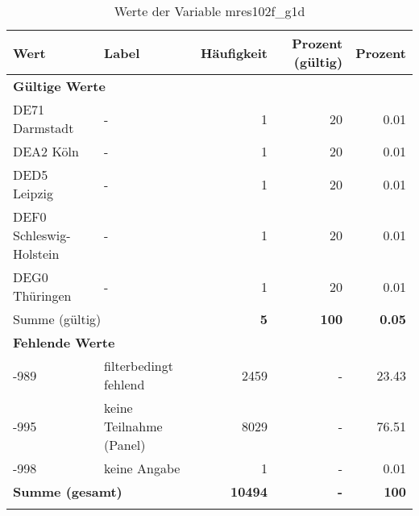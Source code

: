      \begin{longtable}{Xlrrr}
     \toprule
     \textbf{Wert} & \textbf{Label} & \textbf{Häufigkeit} & \textbf{Prozent (gültig)} & \textbf{Prozent} \\
     \endhead
     \midrule
     \multicolumn{5}{l}{\textbf{Gültige Werte}}\\

     \multicolumn{1}{X}{DE71 Darmstadt} &
     - &
     \num{1} &
     \num[round-mode=places,round-precision=2]{20} &
     \num[round-mode=places,round-precision=2]{0.01} \\

     \multicolumn{1}{X}{DEA2 Köln} &
     - &
     \num{1} &
     \num[round-mode=places,round-precision=2]{20} &
     \num[round-mode=places,round-precision=2]{0.01} \\

     \multicolumn{1}{X}{DED5 Leipzig} &
     - &
     \num{1} &
     \num[round-mode=places,round-precision=2]{20} &
     \num[round-mode=places,round-precision=2]{0.01} \\

     \multicolumn{1}{X}{DEF0 Schleswig-Holstein} &
     - &
     \num{1} &
     \num[round-mode=places,round-precision=2]{20} &
     \num[round-mode=places,round-precision=2]{0.01} \\

     \multicolumn{1}{X}{DEG0 Thüringen} &
     - &
     \num{1} &
     \num[round-mode=places,round-precision=2]{20} &
     \num[round-mode=places,round-precision=2]{0.01} \\
     \midrule
      \multicolumn{2}{l}{Summe (gültig)} & \textbf{\num{5}} &
      \textbf{\num{100}} &
         \textbf{\num[round-mode=places,round-precision=2]{0.05}} \\
     \multicolumn{5}{l}{\textbf{Fehlende Werte}}\\
       -989 & filterbedingt fehlend & \num{2459} & - & \num[round-mode=places,round-precision=2]{23.43} \\

       -995 & keine Teilnahme (Panel) & \num{8029} & - & \num[round-mode=places,round-precision=2]{76.51} \\

       -998 & keine Angabe & \num{1} & - & \num[round-mode=places,round-precision=2]{0.01} \\

     \midrule
     \multicolumn{2}{l}{\textbf{Summe (gesamt)}} & \textbf{\num{10494}} & \textbf{-} & \textbf{\num{100}} \\
     \bottomrule
     \caption{Werte der Variable mres102f\_g1d}
     \end{longtable}
     
